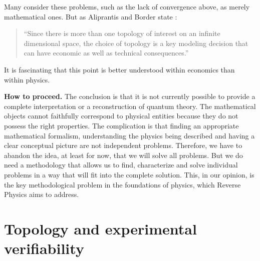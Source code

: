 \documentclass[entropy,article,submit,moreauthors]{Definitions/mdpi}
\begin{document}
Many consider these problems, such as the lack of convergence above, as merely mathematical ones. But as Aliprantis and Border state \cite[p. 163]{AliprantisBorder2006}:
\begin{quote}
	``Since there is more than one topology of interest on an infinite dimensional space, the choice of topology is a key modeling decision that can have economic as well as technical consequences.''
\end{quote}
It is fascinating that this point is better understood within economics than within physics.

\textbf{How to proceed.} The conclusion is that it is not currently possible to provide a complete interpretation or a reconstruction of quantum theory. The mathematical objects cannot faithfully correspond to physical entities because they do not possess the right properties. The complication is that finding an appropriate mathematical formalism, understanding the physics being described and having a clear conceptual picture are not independent problems. Therefore, we have to abandon the idea, at least for now, that we will solve all problems. But we do need a methodology that allows us to find, characterize and solve individual problems in a way that will fit into the complete solution. This, in our opinion, is the key methodological problem in the foundations of physics, which Reverse Physics aims to address.

\section{Topology and experimental verifiability}
\end{document}
